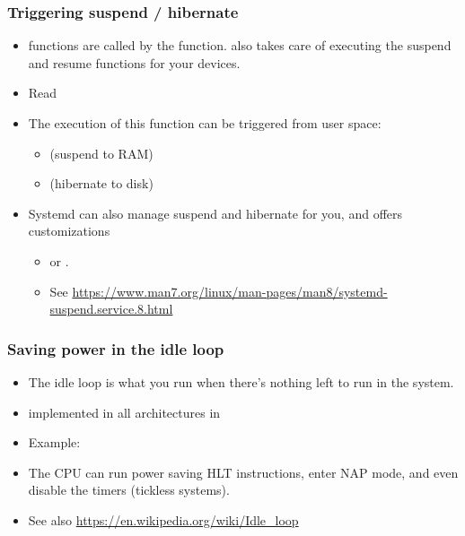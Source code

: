 \begin{frame}
  \frametitle{Triggering suspend / hibernate}
  \begin{itemize}
  \item {} functions are called by the
     function.  also
    takes care of executing the suspend and resume functions
    for your devices.
  \item Read 
  \item The execution of this function can be triggered from
    user space:
    \begin{itemize}
    \item {} (suspend to RAM)
    \item {} (hibernate to disk)
    \end{itemize}
  \item Systemd can also manage suspend and hibernate for you, and
        offers customizations
    \begin{itemize}
       \item {} or .
       \item \small See \url{https://www.man7.org/linux/man-pages/man8/systemd-suspend.service.8.html}
    \end{itemize}
  \end{itemize}
\end{frame}

\begin{frame}
  \frametitle{Saving power in the idle loop}
  \begin{itemize}
  \item The idle loop is what you run when there's nothing left to run
    in the system.
  \item {} implemented in all architectures in
  \item Example: 
  \item The CPU can run power saving HLT instructions, enter NAP mode,
    and even disable the timers (tickless systems).
  \item See also \url{https://en.wikipedia.org/wiki/Idle_loop}
  \end{itemize}
\end{frame}

